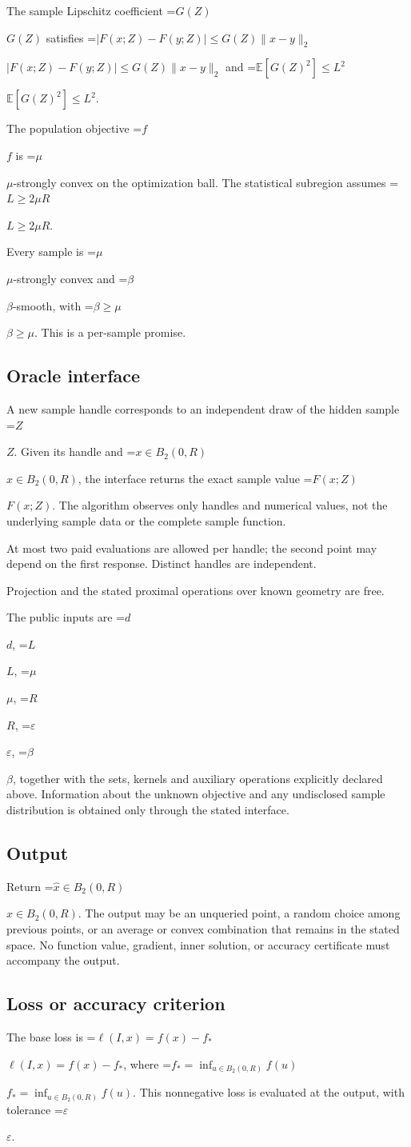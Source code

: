 \documentclass[10pt,a4paper]{article}
\newcommand{\AtlasMath}[1]{\par\begingroup\centering\setbox0=\hbox{$\displaystyle #1$}\ifdim\wd0>1.4\linewidth\typeout{ATLAS WIDE FORMULA: \the\wd0}\fi\ifdim\wd0>\linewidth\resizebox{\linewidth}{!}{\box0}\else\box0\fi\par\endgroup}
\newcommand{\AtlasInlineMath}[1]{\begingroup\setbox0=\hbox{$#1$}\ifdim\wd0>.4\linewidth\endgroup\AtlasMath{#1}\else\endgroup$#1$\fi}
\begin{document}
The sample Lipschitz coefficient \AtlasInlineMath{G(Z)} satisfies \AtlasInlineMath{|F(x;Z)-F(y;Z)|\le G(Z)\|x-y\|_2} and \AtlasInlineMath{\mathbb{E}[G(Z)^2]\le L^2}.

The population objective \AtlasInlineMath{f} is \AtlasInlineMath{\mu}-strongly convex on the optimization ball. The statistical subregion assumes \AtlasInlineMath{L\ge2\mu R}.

Every sample is \AtlasInlineMath{\mu}-strongly convex and \AtlasInlineMath{\beta}-smooth, with \AtlasInlineMath{\beta\ge\mu}. This is a per-sample promise.

\subsection{Oracle interface}
A new sample handle corresponds to an independent draw of the hidden sample \AtlasInlineMath{Z}. Given its handle and \AtlasInlineMath{x\in B_2(0,R)}, the interface returns the exact sample value \AtlasInlineMath{F(x;Z)}. The algorithm observes only handles and numerical values, not the underlying sample data or the complete sample function.

At most two paid evaluations are allowed per handle; the second point may depend on the first response. Distinct handles are independent.

Projection and the stated proximal operations over known geometry are free.

The public inputs are \AtlasInlineMath{d}, \AtlasInlineMath{L}, \AtlasInlineMath{\mu}, \AtlasInlineMath{R}, \AtlasInlineMath{\varepsilon}, \AtlasInlineMath{\beta}, together with the sets, kernels and auxiliary operations explicitly declared above. Information about the unknown objective and any undisclosed sample distribution is obtained only through the stated interface.

\subsection{Output}
Return \AtlasInlineMath{\widehat{x}\in B_2(0,R)}. The output may be an unqueried point, a random choice among previous points, or an average or convex combination that remains in the stated space. No function value, gradient, inner solution, or accuracy certificate must accompany the output.

\subsection{Loss or accuracy criterion}
The base loss is \AtlasInlineMath{\ell(I,x)=f(x)-f_*}, where \AtlasInlineMath{f_*=\inf_{u\in B_2(0,R)}f(u)}. This nonnegative loss is evaluated at the output, with tolerance \AtlasInlineMath{\varepsilon}.
\end{document}
